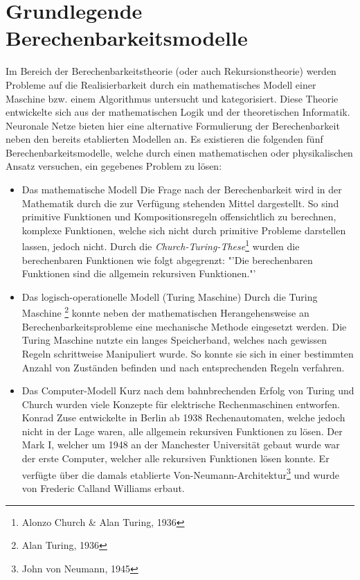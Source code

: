 \section{Grundlegende Berechenbarkeitsmodelle}
\label{sec:neuro_models}
	Im Bereich der Berechenbarkeitstheorie (oder auch Rekursionstheorie) werden Probleme auf die Realisierbarkeit durch ein mathematisches Modell einer Maschine bzw. einem Algorithmus untersucht und kategorisiert. Diese Theorie entwickelte sich aus der mathematischen Logik und der theoretischen Informatik. Neuronale Netze bieten hier eine alternative Formulierung der Berechenbarkeit neben den bereits etablierten Modellen an. Es existieren die folgenden fünf Berechenbarkeitsmodelle, welche durch einen mathematischen oder physikalischen Ansatz versuchen, ein gegebenes Problem zu lösen:
	\begin{itemize}
		\item Das mathematische Modell
			\subitem Die Frage nach der Berechenbarkeit wird in der Mathematik durch die zur Verfügung stehenden Mittel dargestellt. So sind primitive Funktionen und Kompositionsregeln offensichtlich zu berechnen, komplexe Funktionen, welche sich nicht durch primitive Probleme darstellen lassen, jedoch nicht. Durch die \textit{Church-Turing-These}\footnote{Alonzo Church \& Alan Turing, 1936} wurden die berechenbaren Funktionen wie folgt abgegrenzt: "'Die berechenbaren Funktionen sind die allgemein rekursiven Funktionen."'
		\item Das logisch-operationelle Modell (Turing Maschine)
			\subitem Durch die Turing Maschine \footnote{Alan Turing, 1936} konnte neben der mathematischen Herangehensweise an Berechenbarkeitsprobleme eine mechanische Methode eingesetzt werden. Die Turing Maschine nutzte ein langes Speicherband, welches nach gewissen Regeln schrittweise Manipuliert wurde. So konnte sie sich in einer bestimmten Anzahl von Zuständen befinden und nach entsprechenden Regeln verfahren.
		\item Das Computer-Modell
			\subitem Kurz nach dem bahnbrechenden Erfolg von Turing und Church wurden viele Konzepte für elektrische Rechenmaschinen entworfen. Konrad Zuse entwickelte in Berlin ab 1938 Rechenautomaten, welche jedoch nicht in der Lage waren, alle allgemein rekursiven Funktionen zu lösen. Der Mark I, welcher um 1948 an der Manchester Universität gebaut wurde war der erste Computer, welcher alle rekursiven Funktionen lösen konnte. Er verfügte über die damals etablierte Von-Neumann-Architektur\footnote{John von Neumann, 1945} und wurde von Frederic Calland Williams erbaut.

\end{itemize}
